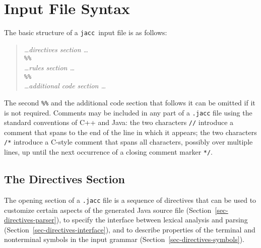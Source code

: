\documentclass[12pt]{article}
\def\jacc{{\tt jacc}}
\begin{document}
\section{Input File Syntax}\label{sec-input-file-syntax}
The basic structure of a \jacc\ input file is as follows:
\begin{quote}
{\it \ldots directives section \ldots} \\
\verb"%%" \\
{\it \ldots rules section \ldots} \\
\verb"%%" \\
{\it \ldots additional code section \ldots}
\end{quote}
The second \verb"%%" and the additional code section that follows it
can be omitted if it is not required.  Comments may be included in
any part of a \verb".jacc" file using the standard conventions of 
C++ and Java: the two characters \verb"//" introduce a comment that
spans to the end of the line in which it appears; the two characters
\verb"/*" introduce a C-style comment that spans all characters,
possibly over multiple lines, up until the next occurrence of a
closing comment marker \verb"*/".

\subsection{The Directives Section}
The opening section of a \verb".jacc" file is a sequence of directives
that can be used to customize certain aspects of the generated Java
source file (Section~\ref{sec-directives-parser}),
to specify the interface between lexical analysis and parsing
(Section~\ref{sec-directives-interface}), and to describe
properties of the terminal and nonterminal symbols in the input
grammar (Section~\ref{sec-directives-symbols}).

\end{document}
